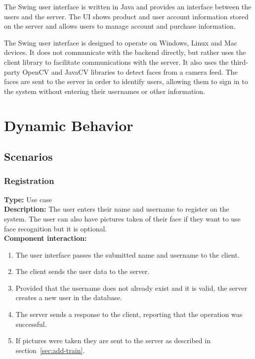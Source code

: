 \documentclass[11pt]{article}
\begin{document}
The Swing user interface is written in Java and provides an interface
between the users and the server. The UI shows product and user account
information stored on the server and allows users to manage account
and purchase information.

The Swing user interface is designed to operate on Windows, Linux and
Mac devices. It does not communicate with the backend directly, but rather
uses the client library to facilitate communications with the server.
It also uses the third-party OpenCV and JavaCV libraries to detect faces
from a camera feed. The faces are sent to the server in order to identify
users, allowing them to sign in to the system without entering their
usernames or other information.


\section{Dynamic Behavior}
\subsection{Scenarios}

\subsubsection{Registration}
\textbf{Type:} Use case\\
\textbf{Description:} The user enters their name and username to register on the system. 
The user can also have pictures taken of their face if they want to use face recognition but it is optional.\\
\textbf{Component interaction:} 
\begin{enumerate} 
\item{The user interface passes the submitted name and username to the client.}
\item{The client sends the user data to the server.}
\item{Provided that the username does not already exist and it is valid, the server creates a new user in the database.}
\item{The server sends a response to the client, reporting that the operation was successful.}
\item{If pictures were taken they are sent to the server as described in section~\ref{sec:add-train}.}
\end{enumerate}
\end{document}
